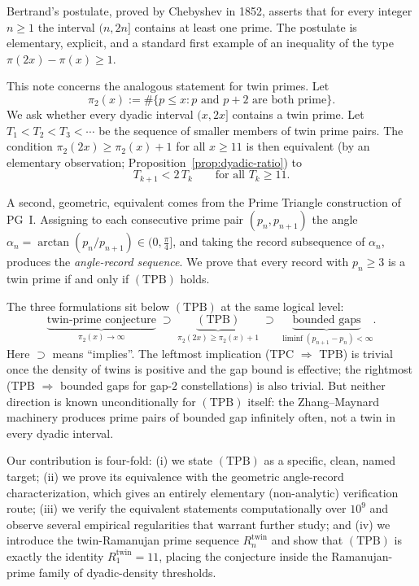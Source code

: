 \documentclass[11pt]{article}
\begin{document}
Bertrand's postulate, proved by Chebyshev in 1852, asserts that for
every integer $n\ge 1$ the interval $(n,2n]$ contains at least one
prime. The postulate is elementary, explicit, and a standard first
example of an inequality of the type $\pi(2x)-\pi(x)\ge 1$.

This note concerns the analogous statement for twin primes. Let
\[
\pi_2(x) := \#\{p\le x\colon p\text{ and }p+2\text{ are both prime}\}.
\]
We ask whether every dyadic interval $(x,2x]$ contains a twin prime.
Let $T_1<T_2<T_3<\cdots$ be the sequence of smaller members of twin
prime pairs. The condition
$\pi_2(2x)\ge\pi_2(x)+1$ for all $x\ge 11$ is then equivalent (by an
elementary observation; Proposition~\ref{prop:dyadic-ratio}) to
\[
T_{k+1}<2\,T_k\qquad\text{for all }T_k\ge 11.
\]

A second, geometric, equivalent comes from the Prime Triangle
construction of PG~I. Assigning to each consecutive prime pair
$(p_n,p_{n+1})$ the angle
$\alpha_n=\arctan(p_n/p_{n+1})\in(0,\tfrac{\pi}{4}]$, and taking the
record subsequence of $\alpha_n$, produces the \emph{angle-record
sequence}. We prove that every record with $p_n\ge 3$ is a twin prime
if and only if $(\mathrm{TPB})$ holds.

The three formulations sit below $(\mathrm{TPB})$ at the same logical
level:
\[
\underbrace{\text{twin-prime conjecture}}_{\pi_2(x)\to\infty}
\;\supset\;
\underbrace{(\mathrm{TPB})}_{\pi_2(2x)\ge\pi_2(x)+1}
\;\supset\;
\underbrace{\text{bounded gaps}}_{\liminf(p_{n+1}-p_n)<\infty}.
\]
Here $\supset$ means ``implies''. The leftmost implication (TPC $\Rightarrow$
TPB) is trivial once the density of twins is positive and the gap
bound is effective; the rightmost (TPB $\Rightarrow$ bounded gaps for
gap-$2$ constellations) is also trivial. But neither direction is known
unconditionally for $(\mathrm{TPB})$ itself: the Zhang--Maynard
machinery produces prime pairs of bounded gap infinitely often, not a
twin in every dyadic interval.

Our contribution is four-fold: (i) we state $(\mathrm{TPB})$ as a
specific, clean, named target; (ii) we prove its equivalence with the
geometric angle-record characterization, which gives an
entirely elementary (non-analytic) verification route; (iii) we verify
the equivalent statements computationally over $10^9$ and observe
several empirical regularities that warrant further study; and
(iv) we introduce the twin-Ramanujan prime sequence
$R^{\mathrm{twin}}_n$ and show that $(\mathrm{TPB})$ is exactly the
identity $R^{\mathrm{twin}}_1=11$, placing the conjecture inside the
Ramanujan-prime family of dyadic-density thresholds.
\end{document}
